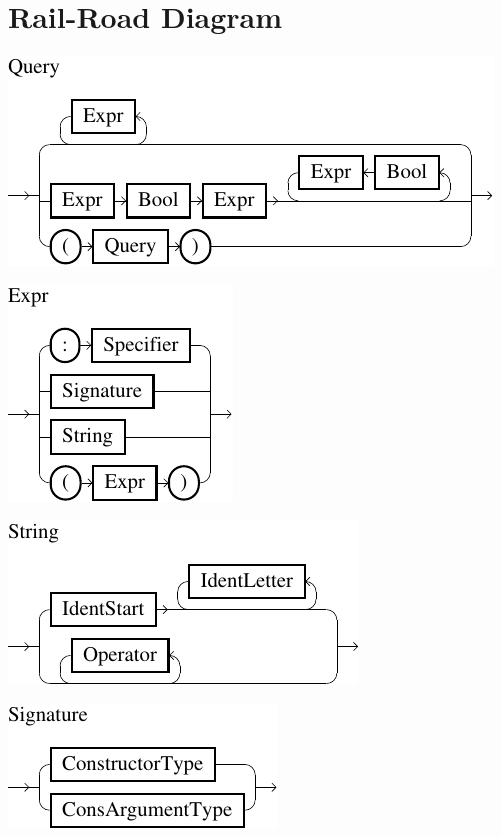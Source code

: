\documentclass[%
	latex,%
	a4paper,%
	oneside,%
	chapterprefix,%
	headsepline,%
	12pt%
]{scrbook}
\begin{document}
\section{Rail-Road Diagram}\label{a:railroad}
\vspace{-0.6cm}
\begin{minipage}{0.85\textwidth}
\begin{minipage}{0.55\textwidth}
\includegraphics{bilder/Query}
\end{minipage}
\hspace{1.3cm}
\begin{minipage}{0.45\textwidth}
\includegraphics{bilder/Expr}
\end{minipage}

\begin{minipage}[t]{0.5\textwidth}
\vspace{1cm}

\includegraphics{bilder/String}

\vspace{1cm}
\includegraphics{bilder/Signature}


\end{minipage}
\end{minipage}
\end{document}
